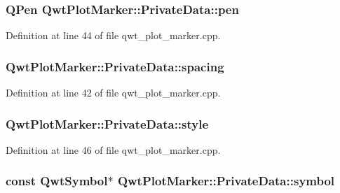 \hypertarget{class_qwt_plot_marker_1_1_private_data_a23899b5a54b966f2e3bc38f4f187c68d}{
\subsubsection[{pen}]{\setlength{\rightskip}{0pt plus 5cm}Q\-Pen Qwt\-Plot\-Marker\-::\-Private\-Data\-::pen}}\label{class_qwt_plot_marker_1_1_private_data_a23899b5a54b966f2e3bc38f4f187c68d}


Definition at line 44 of file qwt\-\_\-plot\-\_\-marker.\-cpp.

\hypertarget{class_qwt_plot_marker_1_1_private_data_ab25ef9fd02d38a7bdcf9f7b301a814e7}{
\subsubsection[{spacing}]{ Qwt\-Plot\-Marker\-::\-Private\-Data\-::spacing}}\label{class_qwt_plot_marker_1_1_private_data_ab25ef9fd02d38a7bdcf9f7b301a814e7}


Definition at line 42 of file qwt\-\_\-plot\-\_\-marker.\-cpp.

\hypertarget{class_qwt_plot_marker_1_1_private_data_a84a5f14c666828466760276ce0f0bc4a}{
\subsubsection[{style}]{ Qwt\-Plot\-Marker\-::\-Private\-Data\-::style}}\label{class_qwt_plot_marker_1_1_private_data_a84a5f14c666828466760276ce0f0bc4a}


Definition at line 46 of file qwt\-\_\-plot\-\_\-marker.\-cpp.

\hypertarget{class_qwt_plot_marker_1_1_private_data_a6544954352ab80745ba5f7f275e9e60c}{
\subsubsection[{symbol}]{\setlength{\rightskip}{0pt plus 5cm}const {\bf Qwt\-Symbol}$\ast$ Qwt\-Plot\-Marker\-::\-Private\-Data\-::symbol}}\label{class_qwt_plot_marker_1_1_private_data_a6544954352ab80745ba5f7f275e9e60c}


